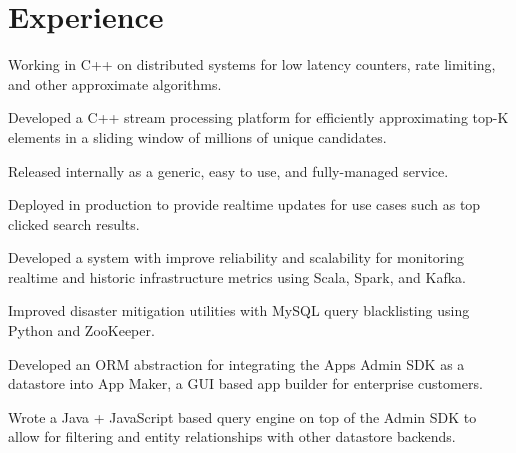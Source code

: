 \documentclass[]{resume}
\begin{document}
\begin{minipage}[t]{0.66\textwidth}


\section{Experience}

\vspace{\topsep} %
\begin{tightemize}
\item Working in C++ on distributed systems for low latency counters, rate limiting, and other approximate algorithms.
\end{tightemize}
\sectionsep

\begin{tightemize}
\item Developed a C++ stream processing platform for efficiently approximating top-K elements in a sliding window of millions of unique candidates.
\item Released internally as a generic, easy to use, and fully-managed service.
\item Deployed in production to provide realtime updates for use cases such as top clicked search results.
\end{tightemize}
\sectionsep

\begin{tightemize}
\item Developed a system with improve reliability and scalability for monitoring realtime and historic infrastructure metrics using Scala, Spark, and Kafka.
\item Improved disaster mitigation utilities with MySQL query blacklisting using Python and ZooKeeper.
\end{tightemize}
\sectionsep

\begin{tightemize}
\item Developed an ORM abstraction for integrating the Apps Admin SDK as a datastore into App Maker, a GUI based app builder for enterprise customers.
\item Wrote a Java + JavaScript based query engine on top of the Admin SDK to allow for filtering and entity relationships with other datastore backends.
\end{tightemize}
\sectionsep


\end{minipage}
\end{document}
